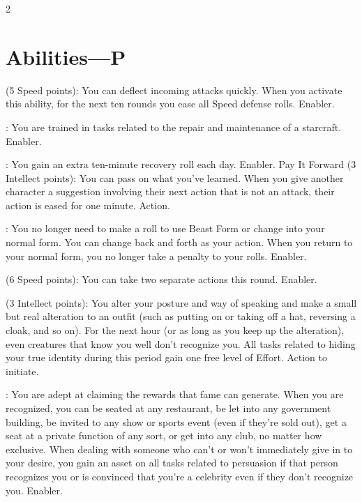 \begin{multicols}{2}

\section{Abilities—P}

 (5 Speed points): You can deflect incoming attacks quickly. When you activate this ability, for the next ten rounds you ease all Speed defense rolls. Enabler. 
 
: You are trained in tasks related to the repair and maintenance of a starcraft. Enabler. 
 
: You gain an extra ten-minute recovery roll each day. Enabler.
Pay It Forward (3 Intellect points): You can pass on what you’ve learned. When you give another character a suggestion involving their next action that is not an attack, their action is eased for one minute. Action. 
 
: You no longer need to make a roll to use Beast Form or change into your normal form. You can change back and forth as your action. When you return to your normal form, you no longer take a penalty to your rolls. Enabler. 
 
 (6 Speed points): You can take two separate actions this round. Enabler. 
 
 (3 Intellect points): You alter your posture and way of speaking and make a small but real alteration to an outfit (such as putting on or taking off a hat, reversing a cloak, and so on). For the next hour (or as long as you keep up the alteration), even creatures that know you well don’t recognize you. All tasks related to hiding your true identity during this period gain one free level of Effort. Action to initiate.
 
: You are adept at claiming the rewards that fame can generate. When you are recognized, you can be seated at any restaurant, be let into any government building, be invited to any show or sports event (even if they’re sold out), get a seat at a private function of any sort, or get into any club, no matter how exclusive. When dealing with someone who can’t or won’t immediately give in to your desire, you gain an asset on all tasks related to persuasion if that person recognizes you or is convinced that you’re a celebrity even if they don’t recognize you. Enabler. 
 

\end{multicols}
